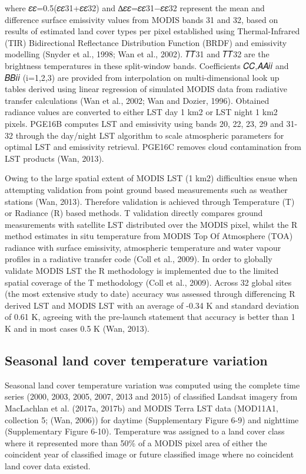 \documentclass[]{book}
\begin{document}
where 𝜀𝜀=0.5(𝜀𝜀31+𝜀𝜀32) and ∆𝜀𝜀=𝜀𝜀31−𝜀𝜀32 represent the mean and
difference surface emissivity values from MODIS bands 31 and 32, based
on results of estimated land cover types per pixel established using
Thermal-Infrared (TIR) Bidirectional Reflectance Distribution Function
(BRDF) and emissivity modelling (Snyder et al., 1998; Wan et al., 2002).
𝑇𝑇31 and 𝑇𝑇32 are the brightness temperatures in these split-window
bands. Coefficients 𝐶𝐶,𝐴𝐴𝑖𝑖 and 𝐵𝐵𝑖𝑖 (i=1,2,3) are provided from
interpolation on multi-dimensional look up tables derived using linear
regression of simulated MODIS data from radiative transfer calculations
(Wan et al., 2002; Wan and Dozier, 1996). Obtained radiance values are
converted to either LST day 1 km2 or LST night 1 km2 pixels. PGE16B
computes LST and emissivity using bands 20, 22, 23, 29 and 31-32 through
the day/night LST algorithm to scale atmospheric parameters for optimal
LST and emissivity retrieval. PGE16C removes cloud contamination from
LST products (Wan, 2013).

Owing to the large spatial extent of MODIS LST (1 km2) difficulties
ensue when attempting validation from point ground based measurements
such as weather stations (Wan, 2013). Therefore validation is achieved
through Temperature (T) or Radiance (R) based methods. T validation
directly compares ground measurements with satellite LST distributed
over the MODIS pixel, whilst the R method estimates in situ temperature
from MODIS Top Of Atmosphere (TOA) radiance with surface emissivity,
atmospheric temperature and water vapour profiles in a radiative
transfer code (Coll et al., 2009). In order to globally validate MODIS
LST the R methodology is implemented due to the limited spatial coverage
of the T methodology (Coll et al., 2009). Across 32 global sites (the
most extensive study to date) accuracy was assessed through differencing
R derived LST and MODIS LST with an average of -0.34 K and standard
deviation of 0.61 K, agreeing with the pre-launch statement that
accuracy is better than 1 K and in most cases 0.5 K (Wan, 2013).

\subsection{Seasonal land cover temperature
variation}\label{seasonal-land-cover-temperature-variation}

Seasonal land cover temperature variation was computed using the
complete time series (2000, 2003, 2005, 2007, 2013 and 2015) of
classified Landsat imagery from MacLachlan et al. (2017a, 2017b) and
MODIS Terra LST data (MOD11A1, collection 5; (Wan, 2006)) for daytime
(Supplementary Figure 6-9) and nighttime (Supplementary Figure 6-10).
Temperature was assigned to a land cover class where it represented more
than 50\% of a MODIS pixel area of either the coincident year of
classified image or future classified image where no coincident land
cover data existed.
\end{document}
